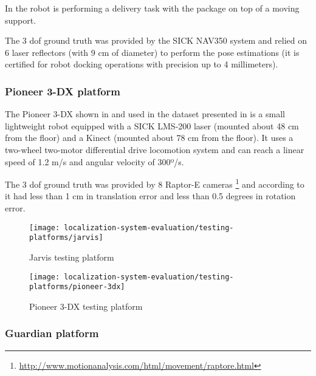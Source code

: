 In  the robot is performing a delivery task with the package on top of a moving support.

The 3 \gls{dof} ground truth was provided by the SICK NAV350 system and relied on 6 laser reflectors (with 9 cm of diameter) to perform the pose estimations (it is certified for robot docking operations with precision up to 4 millimeters).


\subsubsection{Pioneer 3-DX platform}

The Pioneer 3-DX shown in  and used in the dataset presented in \cite{Sturm2012} is a small lightweight robot equipped with a SICK LMS-200 laser (mounted about 48 cm from the floor) and a Kinect (mounted about 78 cm from the floor). It uses a two-wheel two-motor differential drive locomotion system and can reach a linear speed of 1.2 m/s and angular velocity of 300º/s.

The 3 \gls{dof} ground truth was provided by 8 Raptor-E cameras \footnote{\url{http://www.motionanalysis.com/html/movement/raptore.html}} and according to \cite{Sturm2012} it had less than 1 cm in translation error and less than 0.5 degrees in rotation error.

\begin{figure}[H]
	\centering
	\begin{minipage}[b]{0.24\textwidth}
		\centering
		\texttt{[image: localization-system-evaluation/testing-platforms/jarvis]}
		\caption{Jarvis testing platform}
		\label{fig:localization-system-evaluation_jarvis}
	\end{minipage}\hfill
	\begin{minipage}[b]{0.24\textwidth}
		\centering
		\texttt{[image: localization-system-evaluation/testing-platforms/pioneer-3dx]}
		\caption{Pioneer 3-DX testing platform \cite{Sturm2012}}
		\label{fig:localization-system-evaluation_pioneer}
	\end{minipage}
\end{figure}


\subsubsection{Guardian platform}

